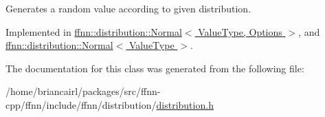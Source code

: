 Generates a random value according to given distribution. 



Implemented in \hyperlink{classffnn_1_1distribution_1_1_normal_ad90aceffa91e82ea29e4928f1aeb1bbe}{ffnn\-::distribution\-::\-Normal$<$ Value\-Type, Options $>$}, and \hyperlink{classffnn_1_1distribution_1_1_normal_ad90aceffa91e82ea29e4928f1aeb1bbe}{ffnn\-::distribution\-::\-Normal$<$ Value\-Type $>$}.



The documentation for this class was generated from the following file\-:\begin{DoxyCompactItemize}
\item 
/home/briancairl/packages/src/ffnn-\/cpp/ffnn/include/ffnn/distribution/\hyperlink{distribution_8h}{distribution.\-h}\end{DoxyCompactItemize}
